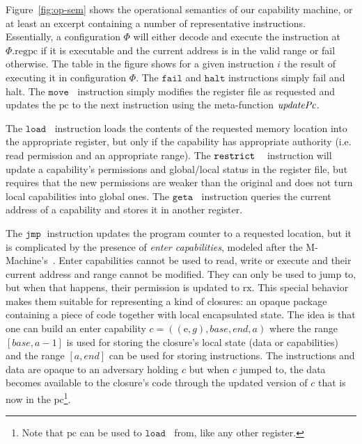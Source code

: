 \documentclass[compsoc,conference,letterpaper,fleqn]{IEEEtran}
\newcommand{\var}[1]{\mathit{#1}}
\newcommand{\gl}{\var{g}}
\newcommand{\pcreg}{\mathrm{pc}}
\newcommand{\addr}{\var{a}}
\newcommand{\start}{\var{base}}
\newcommand{\addrend}{\var{end}}
\newcommand{\plainproj}[1]{\mathrm{#1}}
\newcommand{\memreg}[1][\Phi]{#1.\plainproj{reg}}
\newcommand{\plainfun}[2]{
  \ifthenelse{\equal{#2}{}}
  {\mathit{#1}}
  {\mathit{#1}(#2)}
}
\newcommand{\stdUpdatePc}[1]{\plainfun{updatePc}{#1}}
\newcommand{\zinstr}[1]{\mathtt{#1}}
\newcommand{\fail}{\zinstr{fail}}
\newcommand{\halt}{\zinstr{halt}}
\newcommand{\oneinstr}[2]{\zinstr{#1} \; #2}
\newcommand{\jmp}[1]{\oneinstr{jmp}{#1}}
\newcommand{\twoinstr}[3]{\zinstr{#1} \; #2 \; #3}
\newcommand{\geta}[2]{\twoinstr{geta}{#1}{#2}}
\newcommand{\move}[2]{\twoinstr{move}{#1}{#2}}
\newcommand{\load}[2]{\twoinstr{load}{#1}{#2}}
\newcommand{\threeinstr}[4]{\zinstr{#1} \; #2 \; #3 \; #4}
\newcommand{\restrict}[3]{\threeinstr{restrict}{#1}{#2}{#3}}
\newcommand{\plainperm}[1]{\mathrm{#1}}
\newcommand{\exec}{\plainperm{rx}}
\newcommand{\entry}{\plainperm{e}}
\begin{document}
Figure~\ref{fig:op-sem} shows the operational semantics of our capability
machine, or at least an excerpt containing a number of representative
instructions. Essentially, a configuration $\Phi$ will either decode and execute
the instruction at $\memreg{\pcreg}$ if it is executable and the current address
is in the valid range or fail otherwise. The table in the figure shows for a
given instruction $i$ the result of executing it in configuration $\Phi$. The
$\fail$ and $\halt$ instructions simply fail and halt. The $\move{}{}$
instruction simply modifies the register file as requested and updates the
$\pcreg$ to the next instruction using the meta-function $\stdUpdatePc{}$.

The $\load{}{}$ instruction loads the contents of the requested memory location
into the appropriate register, but only if the capability has appropriate
authority (i.e. read permission and an appropriate range). The $\restrict{}{}$
instruction will update a capability's permissions and global/local status in
the register file, but requires that the new permissions are weaker than the
original and does not turn local capabilities into global ones. The $\geta{}{}$
instruction queries the current address of a capability and stores it in another
register.

The $\jmp{}$ instruction updates the program counter to a requested location,
but it is complicated by the presence of \emph{enter capabilities}, modeled
after the M-Machine's~\cite{Carter:1994:HSF:195473.195579}. Enter capabilities
cannot be used to read, write or execute and their current address and range
cannot be modified. They can only be used to jump to, but when that happens,
their permission is updated to $\exec$. This special behavior makes them
suitable for representing a kind of closures: an opaque package containing a
piece of code together with local encapsulated state. The idea is that one can
build an enter capability $c = ((\entry,\gl),\start,\addrend,\addr)$ where the
range $[\start,\addr-1]$ is used for storing the closure's local state (data or
capabilities) and the range $[\addr,\addrend]$ can be used for storing
instructions. The instructions and data are opaque to an adversary holding $c$
but when $c$ jumped to, the data becomes available to the closure's code through
the updated version of $c$ that is now in the $\pcreg$\footnote{Note that
  $\pcreg$ can be used to $\load{}{}$ from, like any other register.}.
\end{document}

